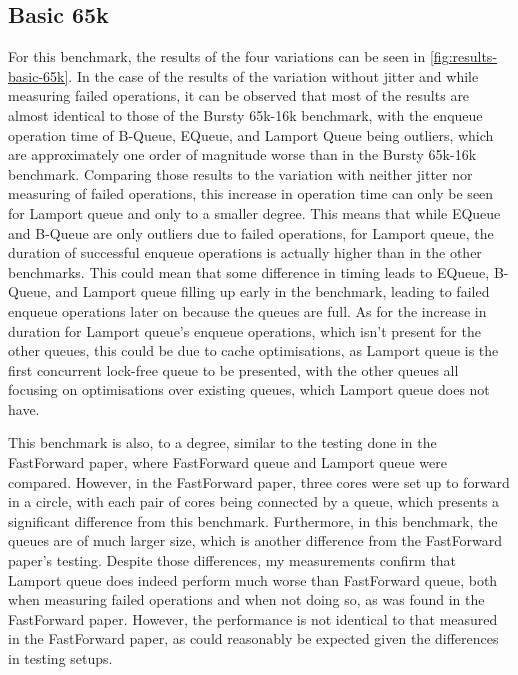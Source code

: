 \subsection{Basic 65k}

For this benchmark, the results of the four variations can be seen in \autoref{fig:results-basic-65k}.
In the case of the results of the variation without jitter and while measuring failed operations,
it can be observed that most of the results are almost identical to those of the Bursty 65k-16k benchmark,
with the enqueue operation time of B-Queue, EQueue, and Lamport Queue being outliers,
which are approximately one order of magnitude worse than in the Bursty 65k-16k benchmark.
Comparing those results to the variation with neither jitter nor measuring of failed operations,
this increase in operation time can only be seen for Lamport queue and only to a smaller degree.
This means that while EQueue and B-Queue are only outliers due to failed operations,
for Lamport queue, the duration of successful enqueue operations is actually higher than in the other benchmarks.
This could mean that some difference in timing leads to EQueue, B-Queue, and Lamport queue filling up
early in the benchmark, leading to failed enqueue operations later on because the queues are full.
As for the increase in duration for Lamport queue's enqueue operations, which isn't present for the other queues,
this could be due to cache optimisations, as Lamport queue is the first concurrent lock-free queue to be presented,
with the other queues all focusing on optimisations over existing queues, which Lamport queue does not
have\cite{Lamport}.

This benchmark is also, to a degree, similar to the testing done in the FastForward paper, where FastForward
queue and Lamport queue were compared.
However, in the FastForward paper, three cores were set up to forward in a circle, with each pair of cores being
connected by a queue, which presents a significant difference from this benchmark\cite{FastForward}.
Furthermore, in this benchmark, the queues are of much larger size, which is another difference from the
FastForward paper's testing.
Despite those differences, my measurements confirm that Lamport queue does indeed perform much worse than
FastForward queue, both when measuring failed operations and when not doing so, as was found in the FastForward paper.
However, the performance is not identical to that measured in the FastForward paper, as could reasonably be
expected given the differences in testing setups.

